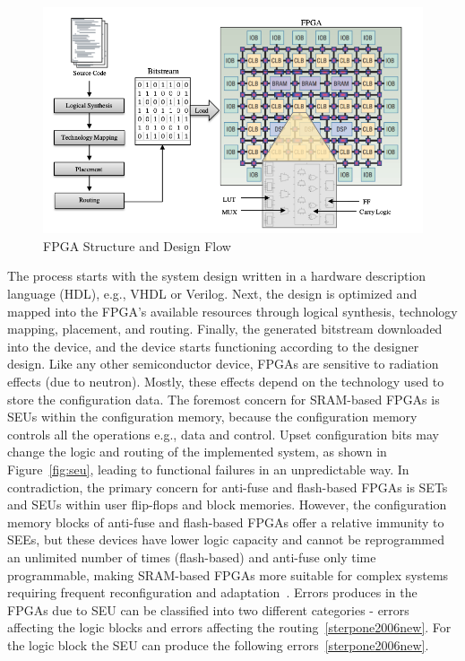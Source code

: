 \begin{figure}[tb!]
 \centering
  \captionsetup{justification=centering}    
   \includegraphics[scale=0.4]{figures/img/FPGA-structure.png}
   \caption{FPGA Structure and Design Flow}
\label{fig:fpga-struct}
\end{figure}




The process starts with the system design written
in a hardware description language (HDL), e.g., VHDL or Verilog. Next, the design is optimized and mapped into the FPGA’s available resources through logical synthesis,
technology mapping, placement, and routing. Finally, the generated bitstream downloaded into the device, and the device starts functioning according to the designer design.
Like any other semiconductor device, FPGAs are sensitive to radiation effects (due to neutron).
Mostly, these effects depend on the technology used to store the configuration data.
The foremost concern for SRAM-based FPGAs is
SEUs within the configuration memory, because the configuration memory controls all the operations e.g., data and control.
Upset configuration bits may change the logic and routing of the implemented system, as
shown in Figure~\ref{fig:seu}, leading to functional failures in an unpredictable way. In contradiction, the primary concern for anti-fuse and flash-based FPGAs is SETs and SEUs within user flip-flops
and block memories. However, the configuration memory blocks of anti-fuse and flash-based
FPGAs offer a relative immunity to SEEs, but these devices have lower logic capacity and
cannot be reprogrammed an unlimited number of times (flash-based) and anti-fuse only time programmable, making SRAM-based FPGAs more
suitable for complex systems requiring frequent reconfiguration and adaptation~\cite{quinn2015validation, violante2004simulation}. Errors produces in the FPGAs due to SEU can be classified into two different categories - errors affecting the logic blocks and errors affecting the routing~\ref{sterpone2006new}. For the logic block the SEU can produce the following errors~\ref{sterpone2006new}.

